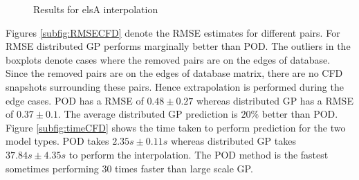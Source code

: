 \begin{figure}[!ht]
  \centering
  \quad
  \caption{Results for elsA interpolation}
\end{figure}

Figures \ref{subfig:RMSECFD} denote the RMSE estimates for different pairs. For RMSE distributed GP performs marginally better than POD. The outliers in the boxplots denote cases where the removed pairs are on the edges of database. Since the removed pairs are on the edges of database matrix, there are no CFD snapshots surrounding these pairs. Hence extrapolation is performed during the edge cases. POD has a RMSE of $0.48\pm0.27$ whereas distributed GP has a RMSE of $0.37\pm0.1$. The average distributed GP prediction is $20\%$ better than POD. Figure \ref{subfig:timeCFD} shows the time taken to perform prediction for the two model types. POD takes $2.35s\pm0.11s$ whereas distributed GP takes $37.84s\pm4.35s$ to perform the interpolation. The POD method is the fastest sometimes performing 30 times faster than large scale GP. 

